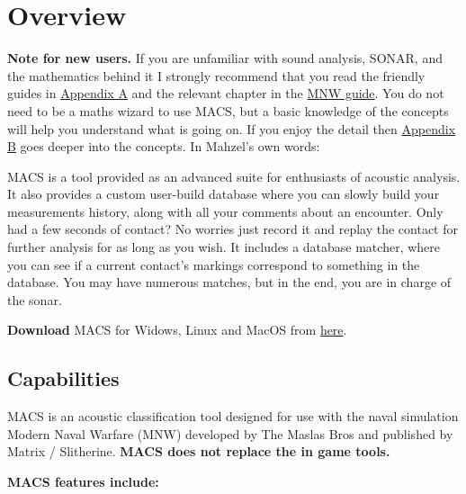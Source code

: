 \section{Overview}
\textbf{Note for new users.} If you are unfamiliar with sound analysis, SONAR, and the mathematics behind it I strongly recommend that you read the friendly guides in \hyperref[sec:Appendix_A]{Appendix A} and the relevant chapter in the \href{https://docs.waveops.io/mnw/mnw-guide.pdf}{MNW guide}. You do not need to be a maths wizard to use MACS, but a basic knowledge of the concepts will help you understand what is going on. If you enjoy the detail then \hyperref[sec:Appendix_B]{Appendix B} goes deeper into the concepts. In Mahzel's own words:

\begin{faintquote}
	MACS is a tool provided as an advanced suite for enthusiasts of acoustic analysis. It also provides a custom user-build database where you can slowly build your measurements history, along with all your comments about an encounter. Only had a few seconds of contact? No worries just record it and replay the contact for further analysis for as long as you wish. It includes a database matcher, where you can see if a current contact's markings correspond to something in the database. You may have numerous matches, but in the end, you are in charge of the sonar.
\end{faintquote}

\textbf{Download} MACS for Widows, Linux and MacOS from \href{https://github.com/Mahzel/MACS}{here}.

\subsection{Capabilities}
MACS is an acoustic classification tool designed for use with the naval simulation Modern Naval Warfare (MNW) developed by The Maslas Bros and published by Matrix / Slitherine. \textbf{MACS does not replace the in game tools.}

\textbf{MACS features include:}

